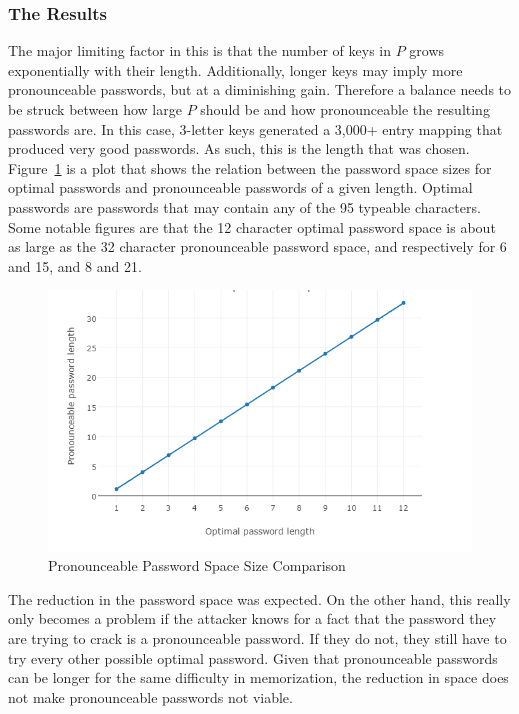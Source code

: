 \documentclass{article}
\begin{document}
\subsubsection{The Results}
\par The major limiting factor in this is that the number of keys in $P$ grows exponentially with their length. Additionally, longer keys may imply more pronounceable passwords, but at a diminishing gain. Therefore a balance needs to be struck between how large $P$ should be and how pronounceable the resulting passwords are. In this case, 3-letter keys generated a 3,000+ entry mapping that produced very good passwords. As such, this is the length that was chosen. Figure~\ref{fig:pronounceable_password_space_size_comparison} is a plot that shows the relation between the password space sizes for optimal passwords and pronounceable passwords of a given length. Optimal passwords are passwords that may contain any of the 95 typeable characters. Some notable figures are that the 12 character optimal password space is about as large as the 32 character pronounceable password space, and respectively for 6 and 15, and 8 and 21.
\begin{figure}[H]
  \centering
  \includegraphics[width=0.5\linewidth]{figures/pronounceable}
  \caption{Pronounceable Password Space Size Comparison}
  \label{fig:pronounceable_password_space_size_comparison}
\end{figure}
\par The reduction in the password space was expected. On the other hand, this really only becomes a problem if the attacker knows for a fact that the password they are trying to crack is a pronounceable password. If they do not, they still have to try every other possible optimal password. Given that pronounceable passwords can be longer for the same difficulty in memorization, the reduction in space does not make pronounceable passwords not viable.
\end{document}
